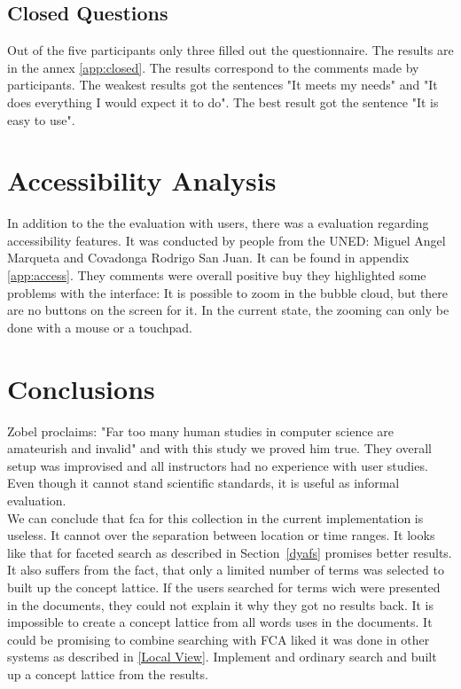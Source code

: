 \documentclass[11pt]{report}
\begin{document}
\subsection{Closed Questions}

Out of the five participants only three filled out the questionnaire. The results are in the annex \ref{app:closed}. The results correspond to the comments made by participants. The weakest results got the sentences "It meets my needs" and "It does everything I would expect it to do". The best result got the sentence "It is easy to use".

\section{Accessibility Analysis}

In addition to the the evaluation with users, there was a evaluation regarding accessibility features. It was conducted by people from the UNED: Miguel Angel Marqueta and Covadonga Rodrigo San Juan. It can be found in appendix \ref{app:access}. They comments were overall positive buy they highlighted some problems with the interface: It is possible to zoom in the bubble cloud, but there are no buttons on the screen for it. In the current state, the zooming can only be done with a mouse or a touchpad. 

\section{Conclusions}

 Zobel \cite{Zobel2004} proclaims: "Far too many human studies in computer science are amateurish and invalid" and with this study we proved him true. They overall setup was improvised and all instructors had no experience with user studies. Even though it cannot stand scientific standards, it is useful as informal evaluation. \\
 
 We can conclude that \acrshort{fca} for this collection in the current implementation is useless. It cannot over the separation between location or time ranges. It looks like that for faceted search as described in Section~\ref{dyafs} promises better results. \\
 
 It also suffers from the fact, that only a limited number of terms was selected to built up the concept lattice. If the users searched for terms wich were presented in the documents, they could not explain it why they got no results back. It is impossible to create a concept lattice from all words uses in the documents. It could be promising to combine searching with FCA liked it was done in other systems as described in \ref{Local View}. Implement and ordinary search and built up a concept lattice from the results. \\
 
\end{document}
